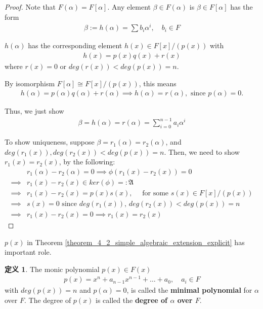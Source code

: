 \documentclass[utf8]{ctexbook}
\theoremstyle{definition}
\newtheorem{protodefinition}{定义}[section]
\newenvironment{definition}
   {\colorlet{shadecolor}{black!15}\begin{shaded}\begin{protodefinition}}
   {\end{protodefinition}\end{shaded}}
\begin{document}
\begin{proof}
Note that $F(\alpha) = F[\alpha]$. Any element $\beta \in F(\alpha)$ is $\beta \in F[\alpha]$ has the form
\begin{align*}
\beta := h(\alpha) = \sum b_i \alpha^i, \quad b_i \in F
\end{align*}

$h(\alpha)$ has the corresponding element $h(x) \in F[x]/(p(x))$ with
\begin{align*}
h(x) = p(x) q(x) + r(x)
\end{align*}
where $r(x) =0$ or $deg(r(x)) < deg(p(x)) = n$.

By isomorphism $F[\alpha] \cong F[x]/(p(x))$, this means
\begin{align*}
h(\alpha) = p(\alpha) q(\alpha) + r(\alpha) \implies h(\alpha) = r(\alpha), \mbox{ since } p(\alpha) = 0.
\end{align*}

Thus, we just show
\begin{align*}
\beta = h(\alpha) = r(\alpha) = \sum_{i=0} ^{n-1} a_i \alpha^i
\end{align*}

To show uniqueness, suppose $\beta = r_1 (\alpha) = r_2 (\alpha)$, and $deg(r_1(x)) , deg(r_2(x)) < deg(p(x)) = n$. Then, we need to show $r_1 (x) = r_2 (x)$, by the following:
\begin{align*}
& r_1 (\alpha) - r_2 (\alpha) = 0 \implies \phi ( r_1(x) - r_2 (x)) = 0 \\
\implies & r_1(x) - r_2 (x) \in ker(\phi) =: \mathfrak{A} \\
\implies & r_1 (x) - r_2 (x) = p(x) s(x), \quad \mbox{ for some } s(x) \in F[x]/(p(x)) \\
\implies & s(x) =0 \mbox{ since }deg(r_1(x)) ,\,  deg(r_2(x)) < deg(p(x)) = n \\
\implies & r_1 (x) - r_2 (x) = 0 \implies r_1 (x) = r_2 (x)
\end{align*}

\end{proof}

$p(x)$ in Theorem \ref{theorem_4_2_simple_algebraic_extension_explicit} has important role.

\begin{definition}
\label{def_4_2_minimal_poly}
The monic polynomial $p(x) \in F(x)$ 
\begin{align*}
p(x) = x^n + a_{n-1} x^{n-1} + \ldots + a_0, \quad a_i \in F
\end{align*} 
with $deg(p(x))=n$ and $p(\alpha)=0$, is called the \textbf{minimal polynomial} for $\alpha$ over $F$. The degree of $p(x)$ is called the \textbf{degree of $\alpha$ over $F$}.
\end{definition}
\end{document}
